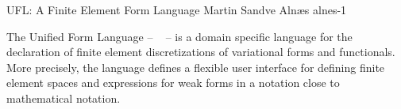               {UFL: A Finite Element Form Language}
              {Martin Sandve Aln\ae{}s}
              {alnes-1}

\index{\ufl{}}


The Unified Form Language -- \ufl{}~\cite{manual:ufl,www:ufl} -- is a
domain specific language for the declaration of finite element
discretizations of variational forms and functionals. More precisely,
the language defines a flexible user interface for defining finite
element spaces and expressions for weak forms in a notation close to
mathematical notation.

